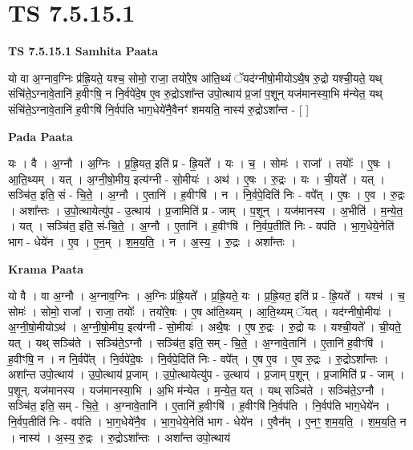 \documentclass[17pt]{extarticle}
\begin{document}
\section{ TS 7.5.15.1 }

\textbf{TS 7.5.15.1 } \newline
\textbf{Samhita Paata} \newline

यो वा अ॒ग्नाव॒ग्निः प्र॑ह्रि॒यते॒ यश्च॒ सोमो॒ राजा॒ तयो॑रे॒ष आ॑ति॒थ्यं ॅयद॑ग्नीषो॒मीयोऽथै॒ष रु॒द्रो यश्ची॒यते॒ यथ् संचि॑ते॒ऽग्नावे॒तानि॑ ह॒वीꣳषि॒ न नि॒र्वपे॑दे॒ष ए॒व रु॒द्रोऽशा᳚न्त उपो॒त्थाय॑ प्र॒जां प॒शून् यज॑मानस्या॒भि म॑न्येत॒ यथ् संचि॑ते॒ऽग्नावे॒तानि॑ ह॒वीꣳषि॑ नि॒र्वप॑ति भाग॒धेये॑नै॒वैनꣳ॑ शमयति॒ नास्य॑ रु॒द्रोऽशा᳚न्त - [  ] \newline

\textbf{Pada Paata} \newline

यः । वै । अ॒ग्नौ । अ॒ग्निः । प्र॒ह्रि॒यत॒ इति॑ प्र - ह्रि॒यते᳚ । यः । च॒ । सोमः॑ । राजा᳚ । तयोः᳚ । ए॒षः । आ॒ति॒थ्यम् । यत् । अ॒ग्नी॒षो॒मीय॒ इत्य॑ग्नी - सो॒मीयः॑ । अथ॑ । ए॒षः । रु॒द्रः । यः । ची॒यते᳚ । यत् । सञ्चि॑त॒ इति॒ सं - चि॒ते॒ । अ॒ग्नौ । ए॒तानि॑ । ह॒वीꣳषि॑ । न । नि॒र्वपे॒दिति॑ निः - वपे᳚त् । ए॒षः । ए॒व । रु॒द्रः । अशा᳚न्तः । उ॒पो॒त्थायेत्यु॑प - उ॒त्थाय॑ । प्र॒जामिति॑ प्र - जाम् । प॒शून् । यज॑मानस्य । अ॒भीति॑ । म॒न्ये॒त॒ । यत् । सञ्चि॑त॒ इति॒ सं-चि॒ते॒ । अ॒ग्नौ । ए॒तानि॑ । ह॒वीꣳषि॑ । नि॒र्वप॒तीति॑ निः - वप॑ति । भा॒ग॒धेये॒नेति॑ भाग - धेये॑न । ए॒व । ए॒न॒म् । श॒म॒य॒ति॒ । न । अ॒स्य॒ । रु॒द्रः । अशा᳚न्तः ।  \newline


\textbf{Krama Paata} \newline

यो वै । वा अ॒ग्नौ । अ॒ग्नाव॒ग्निः । अ॒ग्निः प्र॑ह्रि॒यते᳚ । प्र॒ह्रि॒यते॒ यः । प्र॒ह्रि॒यत॒ इति॑ प्र - ह्रि॒यते᳚ । यश्च॑ । च॒ सोमः॑ । सोमो॒ राजा᳚ । राजा॒ तयोः᳚ । तयो॑रे॒षः । ए॒ष आ॑ति॒थ्यम् । आ॒ति॒थ्यम् ॅयत् । यद॑ग्नीषो॒मीयः॑ । अ॒ग्नी॒षो॒मीयोऽथ॑ । अ॒ग्नी॒षो॒मीय॒ इत्य॑ग्नी - सो॒मीयः॑ । अथै॒षः । ए॒ष रु॒द्रः । रु॒द्रो यः । यश्ची॒यते᳚ । ची॒यते॒ यत् । यथ् सञ्चि॑ते । सञ्चि॑ते॒ऽग्नौ । सञ्चि॑त॒ इति॒ सम् - चि॒ते॒ । अ॒ग्नावे॒तानि॑ । ए॒तानि॑ ह॒वीꣳषि॑ । ह॒वीꣳषि॒ न । न नि॒र्वपे᳚त् । नि॒र्वपे॑दे॒षः । नि॒र्वपे॒दिति॑ निः - वपे᳚त् । ए॒ष ए॒व । ए॒व रु॒द्रः । रु॒द्रोऽशा᳚न्तः । अशा᳚न्त उपो॒त्थाय॑ । उ॒पो॒त्थाय॑ प्र॒जाम् । उ॒पो॒त्थायेत्यु॑प - उ॒त्थाय॑ । प्र॒जाम् प॒शून् । प्र॒जामिति॑ प्र - जाम् । प॒शून्. यज॑मानस्य । यज॑मानस्या॒भि । अ॒भि म॑न्येत । म॒न्ये॒त॒ यत् । यथ् सञ्चि॑ते । सञ्चि॑ते॒ऽग्नौ । सञ्चि॑त॒ इति॒ सम् - चि॒ते॒ । अ॒ग्नावे॒तानि॑ । ए॒तानि॑ ह॒वीꣳषि॑ । ह॒वीꣳषि॑ नि॒र्वप॑ति । नि॒र्वप॑ति भाग॒धेये॑न । नि॒र्वप॒तीति॑ निः - वप॑ति । भा॒ग॒धेये॑नै॒व । भा॒ग॒धेये॒नेति॑ भाग - धेये॑न । ए॒वैन᳚म् । ए॒नꣳ॒॒ श॒म॒य॒ति॒ । श॒म॒य॒ति॒ न । नास्य॑ । अ॒स्य॒ रु॒द्रः । रु॒द्रोऽशा᳚न्तः । अशा᳚न्त उपो॒त्थाय॑ \newline
\end{document}
